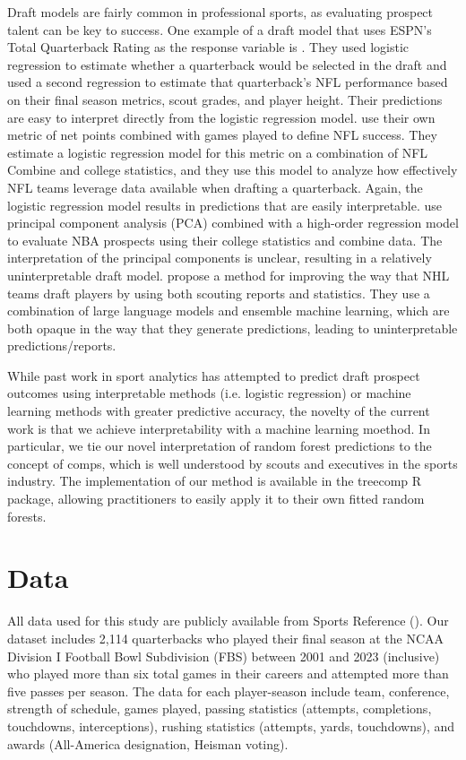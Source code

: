\documentclass{article}
\begin{document}
Draft models are fairly common in professional sports, as evaluating prospect talent can be key to success. One example of a draft model that uses ESPN's Total Quarterback Rating as the response variable is \textcite{craig_predicting_2021}. They used logistic regression to estimate whether a quarterback would be selected in the draft and used a second regression to estimate that quarterback's NFL performance based on their final season metrics, scout grades, and player height. Their predictions are easy to interpret directly from the logistic regression model. \textcite{wolfson_quarterback_2011} use their own metric of net points combined with games played to define NFL success. They estimate a logistic regression model for this metric on a combination of NFL Combine and college statistics, and they use this model to analyze how effectively NFL teams leverage data available when drafting a quarterback. Again, the logistic regression model results in predictions that are easily interpretable. \textcite{berger_jumping_2021} use principal component analysis (PCA) combined with a high-order regression model to evaluate NBA prospects using their college statistics and combine data. The interpretation of the principal components is unclear, resulting in a relatively uninterpretable draft model. \textcite{luo_improving_2024} propose a method for improving the way that NHL teams draft players by using both scouting reports and statistics. They use a combination of large language models and ensemble machine learning, which are both opaque in the way that they generate predictions, leading to uninterpretable predictions/reports.

While past work in sport analytics has attempted to predict draft prospect outcomes using interpretable methods (i.e. logistic regression) or machine learning methods with greater predictive accuracy, the novelty of the current work is that we achieve interpretability with a machine learning moethod. In particular, we tie our novel interpretation of random forest predictions to the concept of comps, which is well understood by scouts and executives in the sports industry. The implementation of our method is available in the treecomp R package, allowing practitioners to easily apply it to their own fitted random forests.

\section{Data}
\label{sec:data}

All data used for this study are publicly available from Sports Reference (\cite{sports_reference_sports_2025}). Our dataset includes 2,114 quarterbacks who played their final season at the NCAA Division I Football Bowl Subdivision (FBS) between 2001 and 2023 (inclusive) who played more than six total games in their careers and attempted more than five passes per season. The data for each player-season include team, conference, strength of schedule, games played, passing statistics (attempts, completions, touchdowns, interceptions), rushing statistics (attempts, yards, touchdowns), and awards (All-America designation, Heisman voting).
\end{document}
